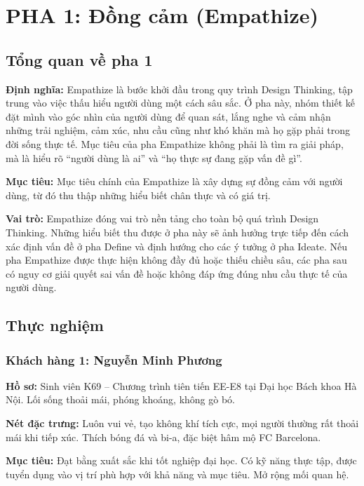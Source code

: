 \documentclass[12pt,a4paper]{report}
\begin{document}
\chapter{PHA 1: Đồng cảm (Empathize)}

\section{Tổng quan về pha 1}

\textbf{Định nghĩa:} Empathize là bước khởi đầu trong quy trình Design Thinking, tập trung vào việc thấu hiểu người dùng một cách sâu sắc. Ở pha này, nhóm thiết kế đặt mình vào góc nhìn của người dùng để quan sát, lắng nghe và cảm nhận những trải nghiệm, cảm xúc, nhu cầu cũng như khó khăn mà họ gặp phải trong đời sống thực tế. Mục tiêu của pha Empathize không phải là tìm ra giải pháp, mà là hiểu rõ ``người dùng là ai'' và ``họ thực sự đang gặp vấn đề gì''.

\textbf{Mục tiêu:} Mục tiêu chính của Empathize là xây dựng sự đồng cảm với người dùng, từ đó thu thập những hiểu biết chân thực và có giá trị.

\textbf{Vai trò:} Empathize đóng vai trò nền tảng cho toàn bộ quá trình Design Thinking. Những hiểu biết thu được ở pha này sẽ ảnh hưởng trực tiếp đến cách xác định vấn đề ở pha Define và định hướng cho các ý tưởng ở pha Ideate. Nếu pha Empathize được thực hiện không đầy đủ hoặc thiếu chiều sâu, các pha sau có nguy cơ giải quyết sai vấn đề hoặc không đáp ứng đúng nhu cầu thực tế của người dùng.

\section{Thực nghiệm}

\subsection*{Khách hàng 1: Nguyễn Minh Phương}
\textbf{Hồ sơ:} Sinh viên K69 -- Chương trình tiên tiến EE-E8 tại Đại học Bách khoa Hà Nội. Lối sống thoải mái, phóng khoáng, không gò bó.

\textbf{Nét đặc trưng:} Luôn vui vẻ, tạo không khí tích cực, mọi người thường rất thoải mái khi tiếp xúc. Thích bóng đá và bi-a, đặc biệt hâm mộ FC Barcelona.

\textbf{Mục tiêu:} Đạt bằng xuất sắc khi tốt nghiệp đại học. Có kỹ năng thực tập, được tuyển dụng vào vị trí phù hợp với khả năng và mục tiêu. Mở rộng mối quan hệ.
\end{document}
